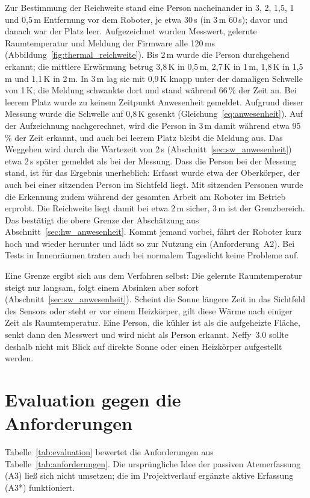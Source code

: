 Zur Bestimmung der Reichweite stand eine Person nacheinander in 3, 2, 1{,}5, 1 und 0{,}5\,m
Entfernung vor dem Roboter, je etwa 30\,s (in 3\,m 60\,s); davor und danach war der Platz
leer. Aufgezeichnet wurden Messwert, gelernte Raumtemperatur und Meldung der Firmware alle
120\,ms (Abbildung~\ref{fig:thermal_reichweite}). Bis 2\,m wurde die Person durchgehend erkannt;
die mittlere Erwärmung betrug 3{,}8\,K in 0{,}5\,m, 2{,}7\,K in 1\,m, 1{,}8\,K in 1{,}5\,m und
1{,}1\,K in 2\,m. In 3\,m lag sie mit 0{,}9\,K knapp unter der damaligen Schwelle von 1\,K; die
Meldung schwankte dort und stand während 66\,\% der Zeit an. Bei leerem Platz wurde zu keinem
Zeitpunkt Anwesenheit gemeldet. Aufgrund dieser Messung wurde die Schwelle auf 0{,}8\,K gesenkt
(Gleichung~\ref{eq:anwesenheit}). Auf der Aufzeichnung nachgerechnet, wird die Person in 3\,m
damit während etwa 95\,\% der Zeit erkannt, und auch bei leerem Platz bleibt die Meldung aus.
Das Weggehen wird durch die Wartezeit von 2\,s (Abschnitt~\ref{sec:sw_anwesenheit}) etwa 2\,s
später gemeldet als bei der Messung.
Dass die Person bei der Messung stand, ist für das Ergebnis unerheblich: Erfasst wurde etwa der
Oberkörper, der auch bei einer sitzenden Person im Sichtfeld liegt. Mit sitzenden Personen wurde
die Erkennung zudem während der gesamten Arbeit am Roboter im Betrieb erprobt.
Die Reichweite liegt damit bei etwa 2\,m sicher, 3\,m ist der Grenzbereich. Das bestätigt die obere
Grenze der Abschätzung aus Abschnitt~\ref{sec:hw_anwesenheit}. Kommt jemand vorbei, fährt der
Roboter kurz hoch und wieder herunter und lädt so zur Nutzung ein (Anforderung~A2). Bei Tests in Innenräumen traten auch bei
normalem Tageslicht keine Probleme auf.

Eine Grenze ergibt sich aus dem Verfahren selbst: Die gelernte Raumtemperatur steigt nur langsam,
folgt einem Absinken aber sofort (Abschnitt~\ref{sec:sw_anwesenheit}). Scheint die Sonne längere
Zeit in das Sichtfeld des Sensors oder steht er vor einem Heizkörper, gilt diese Wärme nach einiger
Zeit als Raumtemperatur. Eine Person, die kühler ist als die aufgeheizte Fläche, senkt dann den
Messwert und wird nicht als Person erkannt. Neffy~3.0 sollte deshalb nicht mit Blick auf direkte
Sonne oder einen Heizkörper aufgestellt werden.

\section{Evaluation gegen die Anforderungen}
\label{sec:evaluation}

Tabelle~\ref{tab:evaluation} bewertet die Anforderungen aus Tabelle~\ref{tab:anforderungen}.
Die ursprüngliche Idee der passiven Atemerfassung (A3) ließ sich nicht umsetzen; die im
Projektverlauf ergänzte aktive Erfassung (A3*) funktioniert.

